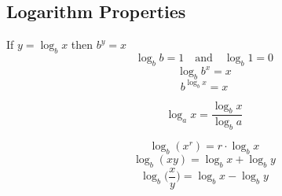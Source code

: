\documentclass[12pt, a5paper]{article}
\begin{document}
\subsection*{Logarithm Properties}
\noindent If $y= \log_{b} x$ then $b^y = x$ 
$$\log_{b} b = 1\quad \text{and}\quad \log_{b} 1 = 0$$
$$\log_{b} b^x = x$$
$$b^{\log_{b} x} = x$$

$$\log_{a} x = \dfrac{\log_{b} x}{\log_{b} a}$$

$$\log_{b} (x^r) = r \cdot \log_{b} x$$
$$\log_{b} (xy) = \log_{b} x + \log_{b} y$$
$$\log_{b} \Big(\dfrac{x}{y}\Big) = \log_{b} x - \log_{b} y$$
\end{document}
